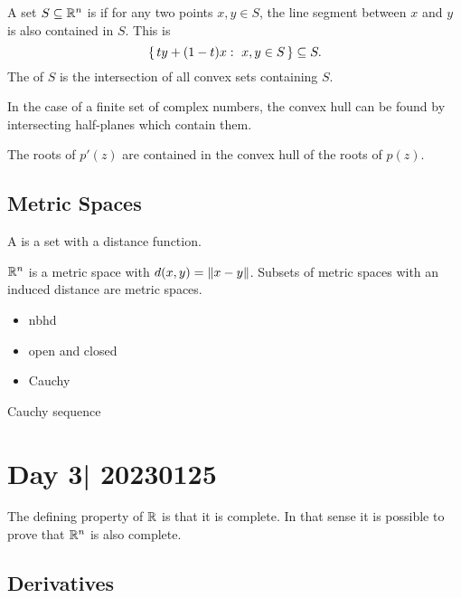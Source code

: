 \documentclass[12pt]{memoir}
\begin{document}
\begin{Def}
    A set $S\subseteq\mathbb{R}^n$ is  if for any two points $x,y\in S$, the line segment between $x$ and $y$ is also contained in $S$. This is 
    $$\{\,ty+(1-t)x:\ x,y\in S\,\}\subseteq S.$$
    The  of $S$ is the intersection of all convex sets containing $S$. 
\end{Def}

In the case of a finite set of complex numbers, the convex hull can be found by intersecting half-planes which contain them.

\begin{Cor}
The roots of $p'(z)$ are contained in the convex hull of the roots of $p(z)$. 
\end{Cor}

\subsection{Metric Spaces}

\begin{Def}
    A  is a set with a distance function.
\end{Def}

\begin{Ex}
    $\mathbb{R}^n$ is a metric space with $d(x,y)=\norm{x-y}$. Subsets of metric spaces with an induced distance are metric spaces. 
\end{Ex}

\begin{itemize}
    \item nbhd
    \item open and closed
    \item Cauchy
\end{itemize}

\begin{Def}
    Cauchy sequence
\end{Def}

\section{Day 3| 20230125}

The defining property of $\mathbb{R}$ is that it is complete. In that sense it is possible to prove that $\mathbb{R}^n$ is also complete.

\subsection{Derivatives}
\end{document}
